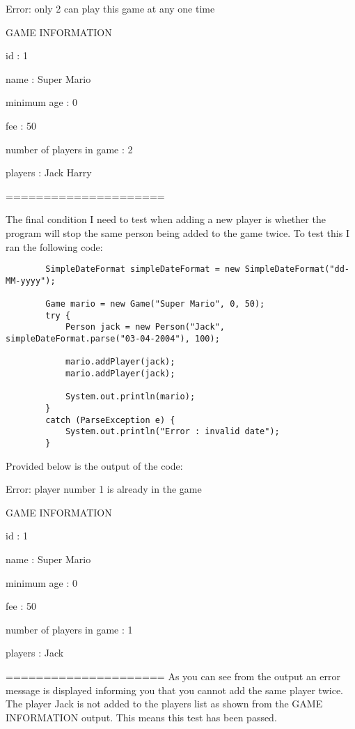 \documentclass[a4paper]{article}
\begin{document}
\noindent Error: only 2 can play this game at any one time

\noindent GAME INFORMATION

\noindent id : 1

\noindent name : Super Mario

\noindent minimum age : 0

\noindent fee : 50

\noindent number of players in game : 2

\noindent players : Jack Harry 

\noindent ===================== \newline

The final condition I need to test when adding a new player is whether the program will stop the same person being added to the game twice. To test this I ran the following code: \begin{lstlisting}
		SimpleDateFormat simpleDateFormat = new SimpleDateFormat("dd-MM-yyyy");

        Game mario = new Game("Super Mario", 0, 50);
        try {
            Person jack = new Person("Jack", simpleDateFormat.parse("03-04-2004"), 100);

            mario.addPlayer(jack);
            mario.addPlayer(jack);

            System.out.println(mario);
        }
        catch (ParseException e) {
            System.out.println("Error : invalid date");
        }
\end{lstlisting}
Provided below is the output of the code: \newline

\noindent Error: player number 1 is already in the game

\noindent GAME INFORMATION

\noindent id : 1

\noindent name : Super Mario

\noindent minimum age : 0

\noindent fee : 50

\noindent number of players in game : 1

\noindent players : Jack 

\noindent ===================== \newline
As you can see from the output an error message is displayed informing you that you cannot add the same player twice. The player Jack is not added to the players list as shown from the GAME INFORMATION output. This means this test has been passed. \newline
\end{document}

